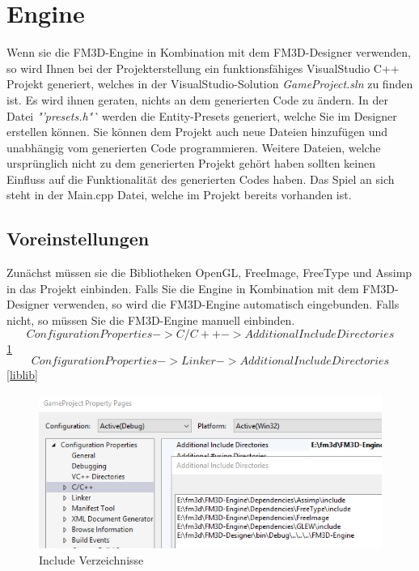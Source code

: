 \section{Engine}
\label{verwendung_engine}
Wenn sie die FM3D-Engine in Kombination mit dem FM3D-Designer verwenden, so wird Ihnen bei der Projekterstellung ein funktionsfähiges VisualStudio C++ Projekt generiert, welches in der VisualStudio-Solution \textit{GameProject.sln} zu finden ist.
Es wird ihnen geraten, nichts an dem generierten Code zu ändern.
In der Datei \textit{"'presets.h"`} werden die Entity-Presets generiert, welche Sie im Designer erstellen können.
Sie können dem Projekt auch neue Dateien hinzufügen und unabhängig vom generierten Code programmieren. Weitere Dateien, welche ursprünglich nicht zu dem generierten Projekt gehört haben sollten keinen Einfluss auf die Funktionalität des generierten Codes haben.
Das Spiel an sich steht in der Main.cpp Datei, welche im Projekt bereits vorhanden ist.

\subsection{Voreinstellungen}
Zunächst müssen sie die Bibliotheken OpenGL, FreeImage, FreeType und Assimp in das Projekt einbinden. Falls Sie die Engine in Kombination mit dem FM3D-Designer verwenden, so wird die FM3D-Engine automatisch eingebunden. Falls nicht, so müssen Sie die FM3D-Engine manuell einbinden.
$$Configuration Properties->C/C++->Additional Include Directories$$\cref{includeinc}
$$Configuration Properties->Linker->Additional Include Directories$$
\cref{liblib}

\begin{figure}
	\begin{center}
		\includegraphics[width=\textwidth]{04verwendung/Engine/include.png}
		\caption{Include Verzeichnisse}\label{includeinc}
	\end{center}
\end{figure}

